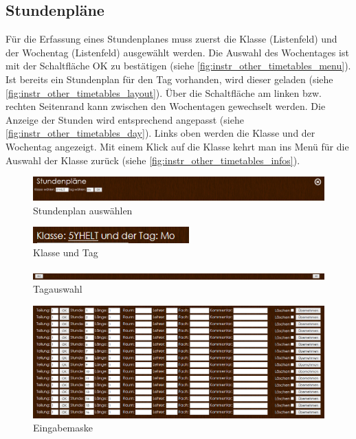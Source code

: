 \subsection{Stundenpläne}
Für die Erfassung eines Stundenplanes muss zuerst die Klasse (Listenfeld) und der Wochentag (Listenfeld) ausgewählt werden. Die Auswahl des Wochentages ist mit der Schaltfläche OK zu bestätigen (siehe \autoref{fig:instr_other_timetables_menu}). Ist bereits ein Stundenplan für den Tag vorhanden, wird dieser geladen (siehe \autoref{fig:instr_other_timetables_layout}). Über die Schaltfläche am linken bzw. rechten Seitenrand kann zwischen den Wochentagen gewechselt werden. Die Anzeige der Stunden wird entsprechend angepasst (siehe \autoref{fig:instr_other_timetables_day}).
Links oben werden die Klasse und der Wochentag angezeigt. Mit einem Klick auf die Klasse kehrt man ins Menü für die Auswahl der Klasse zurück (siehe \autoref{fig:instr_other_timetables_infos}).
\begin{figure}[H]
\centering
\includegraphics[keepaspectratio=true, width=17cm]{images/screenshots/timetables_input_menu.png}
\caption{Stundenplan auswählen}
\label{fig:instr_other_timetables_menu}
\end{figure}
\begin{figure}[H]
\centering
\includegraphics[keepaspectratio=true, width=6cm]{images/screenshots/timetables_input_infos.png}
\caption{Klasse und Tag}
\label{fig:instr_other_timetables_infos}
\end{figure}
\begin{figure}[H]
\centering
\includegraphics[keepaspectratio=true, width=17cm]{images/screenshots/timetables_input_day.png}
\caption{Tagauswahl}
\label{fig:instr_other_timetables_day}
\end{figure}
\begin{figure}[H]
\centering
\includegraphics[keepaspectratio=true, width=17cm]{images/screenshots/timetables_input_layout.png}
\caption{Eingabemaske}
\label{fig:instr_other_timetables_layout}
\end{figure}
